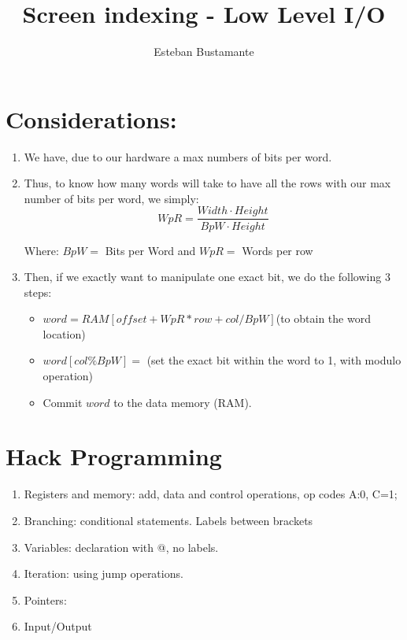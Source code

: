 \documentclass{article}
\title{Screen indexing - Low Level I/O}
\author{Esteban Bustamante}
\begin{document}
\maketitle
\section*{Considerations:}
\begin{enumerate}
    \item  We have, due to our hardware a max numbers of bits per word.
    \item  Thus, to know how many words will take to have all the rows with our max number of bits per word, we simply:
    $$WpR=\frac{Width\cdot Height}{BpW\cdot Height} $$
\begin{center}
    Where: $BpW=$ Bits per Word and $ WpR=$ Words per row
\end{center}
\item Then, if we exactly want to manipulate one exact bit, we do the following 3 steps:
\begin{itemize}
    \item $word=RAM[offset+WpR*row+col/BpW] $(to obtain the word location)
    \item $ word[col\%BpW]=$ (set the exact bit within the word to 1, with modulo operation)
    \item Commit $word$ to the data memory (RAM).
\end{itemize}
\end{enumerate}
\section*{Hack Programming}
\begin{enumerate}
    \item Registers and memory: add, data and control operations, op codes A:0, C=1;
    \item Branching: conditional statements. Labels between brackets
    \item Variables: declaration with @, no labels.
    \item Iteration: using jump operations.
    \item Pointers: 
    \item Input/Output
\end{enumerate}
\end{document}

